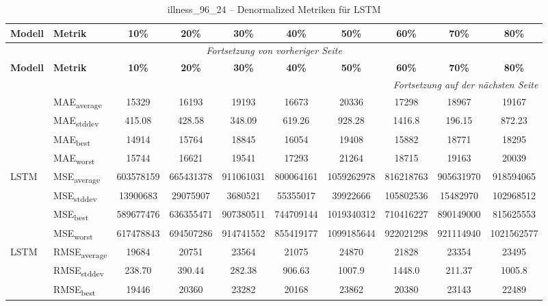 {\small
\begin{longtable}{l l c c c c c c c c}
    \toprule
    \textbf{Modell} & \textbf{Metrik} & \textbf{10\%} & \textbf{20\%} & \textbf{30\%} & \textbf{40\%} & \textbf{50\%} & \textbf{60\%} & \textbf{70\%} & \textbf{80\%} \\
    \midrule
    \endfirsthead
    \multicolumn{10}{c}{\textit{Fortsetzung von vorheriger Seite}} \\
    \toprule
    \textbf{Modell} & \textbf{Metrik} & \textbf{10\%} & \textbf{20\%} & \textbf{30\%} & \textbf{40\%} & \textbf{50\%} & \textbf{60\%} & \textbf{70\%} & \textbf{80\%} \\
    \midrule
    \endhead
    \midrule
    \multicolumn{10}{r}{\textit{Fortsetzung auf der nächsten Seite}} \\
    \midrule
    \endfoot
    \bottomrule
    \caption{illness_96_24 -- Denormalized Metriken für LSTM}
    \label{tab:illness_96_24_denormalized_lstm}
    \endlastfoot
\multirow{4}{*}{LSTM} & MAE\textsubscript{average} & 15329 & 16193 & 19193 & 16673 & 20336 & 17298 & 18967 & 19167 \\
 & MAE\textsubscript{stddev} & 415.08 & 428.58 & 348.09 & 619.26 & 928.28 & 1416.8 & 196.15 & 872.23 \\
 & MAE\textsubscript{best} & 14914 & 15764 & 18845 & 16054 & 19408 & 15882 & 18771 & 18295 \\
 & MAE\textsubscript{worst} & 15744 & 16621 & 19541 & 17293 & 21264 & 18715 & 19163 & 20039 \\
\cmidrule(lr){2-10}
\multirow{4}{*}{LSTM} & MSE\textsubscript{average} & 603578159 & 665431378 & 911061031 & 800064161 & 1059262978 & 816218763 & 905631970 & 918594065 \\
 & MSE\textsubscript{stddev} & 13900683 & 29075907 & 3680521 & 55355017 & 39922666 & 105802536 & 15482970 & 102968512 \\
 & MSE\textsubscript{best} & 589677476 & 636355471 & 907380511 & 744709144 & 1019340312 & 710416227 & 890149000 & 815625553 \\
 & MSE\textsubscript{worst} & 617478843 & 694507286 & 914741552 & 855419177 & 1099185644 & 922021298 & 921114940 & 1021562577 \\
\cmidrule(lr){2-10}
\multirow{4}{*}{LSTM} & RMSE\textsubscript{average} & 19684 & 20751 & 23564 & 21075 & 24870 & 21828 & 23354 & 23495 \\
 & RMSE\textsubscript{stddev} & 238.70 & 390.44 & 282.38 & 906.63 & 1007.9 & 1448.0 & 211.37 & 1005.8 \\
 & RMSE\textsubscript{best} & 19446 & 20360 & 23282 & 20168 & 23862 & 20380 & 23143 & 22489 \\

\end{longtable}}
